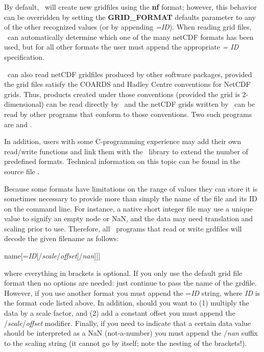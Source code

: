 By default, \GMT\ will create new gridfiles using the {\bf nf} format; however,
this behavior can be overridden by setting the {\bf GRID\_FORMAT} defaults parameter
to any of the other recognized values (or by appending {\it =ID}).
When reading grid files, \GMT\ can automatically
determine which one of the many netCDF formats has been used, but for all other formats
the user must append the appropriate {\it = ID} specification.

\GMT\ can also read netCDF gridfiles produced by other software packages, provided the grid files
satisfy the COARDS and Hadley Centre conventions for NetCDF grids. Thus, products created under
those conventions (provided the grid is 2-dimensional) can be read directly by \GMT\ and the netCDF grids
written by \GMT\ can be read by other programs that conform to those conventions. Two such programs are
and
.

In addition, users with some C-programming experience may add
their own read/write functions and link them with the \GMT\ library
to extend the number of predefined formats.  Technical information
on this topic can be found in the source file . 

Because some formats have limitations on the range of values they can store
it is sometimes necessary to provide more
than simply the name of the file and its ID on the command line.  For instance,
a native short integer file may use a unique value to signify an empty node
or NaN, and the data may need translation and scaling prior to use.
Therefore, all \GMT\ programs that read or write grdfiles will decode
the given filename as follows:

\vspace{\baselineskip} 

\par 	name[={\it ID}[/{\it scale}/{\it offset}[/{\it nan}]]]\par 

\vspace{\baselineskip} 

\noindent
where everything in brackets is optional.  If you only use the default
grid file format then no options are needed: just continue to pass
the name of the grdfile.  However, if you use another format you must
append the ={\it ID} string, where {\it ID} is the format code
listed above.  In addition, should you want to (1) multiply the data by
a scale factor, and (2) add a constant offset you must append the
/{\it scale}/{\it offset} modifier.  Finally, if you need to indicate
that a certain data value should be interpreted as a NaN (not-a-number)
you must append the /{\it nan} suffix to the scaling string (it cannot
go by itself; note the nesting of the brackets!). 

